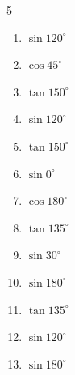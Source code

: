 \begin{multicols}{5}
\begin{enumerate}
  \item $\displaystyle \sin{120^\circ}$


  \item $\displaystyle \cos{45^\circ}$


  \item $\displaystyle \tan{150^\circ}$


  \item $\displaystyle \sin{120^\circ}$


  \item $\displaystyle \tan{150^\circ}$


  \item $\displaystyle \sin{0^\circ}$

        \phantom{$\displaystyle =0$}

  \item $\displaystyle \cos{180^\circ}$

        \phantom{$\displaystyle =-1$}

  \item $\displaystyle \tan{135^\circ}$

        \phantom{$\displaystyle =-1$}

  \item $\displaystyle \sin{30^\circ}$


  \item $\displaystyle \sin{180^\circ}$

        \phantom{$\displaystyle =0$}

\columnbreak %

  \item $\displaystyle \tan{135^\circ}$

        \phantom{$\displaystyle =-1$}

  \item $\displaystyle \sin{120^\circ}$


  \item $\displaystyle \sin{180^\circ}$


\end{enumerate}
\end{multicols}
